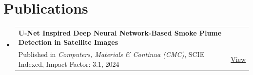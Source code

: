\documentclass[a4paper,10pt]{article}
\begin{document}
\section*{Publications}
\begin{itemize}[leftmargin=1em, itemsep=3pt]
    \item
    \begin{tabularx}{\linewidth}{@{}Xr@{}}
        \textbf{U-Net Inspired Deep Neural Network-Based Smoke Plume Detection in Satellite Images} \\
        Published in \textit{Computers, Materials \& Continua (CMC)}, SCIE Indexed, Impact Factor: 3.1, 2024
        & \href{https://www.techscience.com/cmc/v79n1/56308}{\small View} \\
    \end{tabularx}
\end{itemize}
\end{document}

